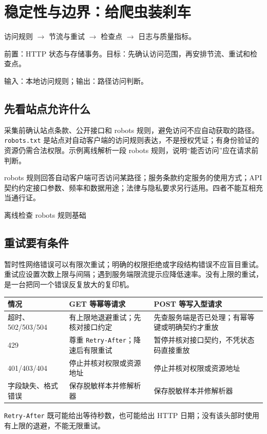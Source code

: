 \chapter{稳定性与边界：给爬虫装刹车}\label{ch:reliability}
\begin{tcolorbox}[title=章首知识地图,colframe=Ink]
访问规则 $\longrightarrow$ 节流与重试 $\longrightarrow$ 检查点 $\longrightarrow$ 日志与质量指标。
\end{tcolorbox}

\begin{tcolorbox}[title=学习目标与前置知识,colframe=Ink!65,colback=Ink!2]
前置：HTTP 状态与存储事务。目标：先确认访问范围，再安排节流、重试和检查点。\par
输入：本地访问规则；输出：路径访问判断。
\end{tcolorbox}

\section{先看站点允许什么}
采集前确认站点条款、公开接口和 robots 规则，避免访问不应自动获取的路径。\texttt{robots.txt} 是站点对自动客户端的访问规则表达，不是授权凭证；有身份验证的资源仍需合法权限。示例离线解析一段 robots 规则，说明“能否访问”应在请求前判断。

robots 规则回答自动客户端可否访问某路径；服务条款约定服务的使用方式；API 契约约定接口参数、频率和数据用途；法律与隐私要求另行适用。四者不能互相充当通行证。

\begin{example}{离线检查 robots 规则}{基础}
\end{example}

\section{重试要有条件}
暂时性网络错误可以有限次重试；明确的权限拒绝或字段结构错误不应盲目重试。重试应设置次数上限与间隔；遇到服务端限流提示应降低速率。没有上限的重试，是一台把同一个错误反复放大的复印机。

\begin{center}\small
\begin{tabularx}{\textwidth}{@{}p{}p{}X@{}}
\toprule
情况 & GET 等幂等请求 & POST 等写入型请求\\
\midrule
超时、502/503/504 & 有上限地退避重试；先核对接口约定 & 先查服务端是否已处理；有幂等键或明确契约才重放\\
429 & 尊重 \texttt{Retry-After}；降速后有限重试 & 暂停并核对接口契约，不凭状态码直接重放\\
401/403/404 & 停止并核对权限或资源地址 & 停止并核对权限或资源地址\\
字段缺失、格式错误 & 保存脱敏样本并修解析器 & 保存脱敏样本并修解析器\\
\bottomrule
\end{tabularx}
\end{center}
\texttt{Retry-After} 既可能给出等待秒数，也可能给出 HTTP 日期；没有该头部时使用有上限的退避，不能无限重试。

